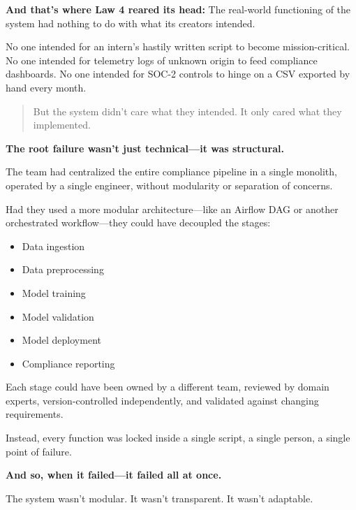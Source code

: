     \medskip
    
    \textbf{And that’s where Law 4 reared its head:}  
    The real-world functioning of the system had nothing to do with what its creators intended.
    
    No one intended for an intern’s hastily written script to become mission-critical.  
    No one intended for telemetry logs of unknown origin to feed compliance dashboards.  
    No one intended for SOC-2 controls to hinge on a CSV exported by hand every month.
    
    \begin{quote}
    But the system didn’t care what they intended.
    It only cared what they implemented.
    \end{quote}
    
    \medskip
    
    \textbf{The root failure wasn’t just technical—it was structural.}
    
    The team had centralized the entire compliance pipeline in a single monolith, operated by a single engineer, without modularity or separation of concerns.
    
    Had they used a more modular architecture—like an Airflow DAG or another orchestrated workflow—they could have decoupled the stages:
    
    \begin{itemize}
        \item Data ingestion
        \item Data preprocessing
        \item Model training
        \item Model validation
        \item Model deployment
        \item Compliance reporting
    \end{itemize}
    
    Each stage could have been owned by a different team, reviewed by domain experts, version-controlled independently, and validated against changing requirements.
    
    Instead, every function was locked inside a single script, a single person, a single point of failure.
    
    \medskip
    
    \textbf{And so, when it failed—it failed all at once.}
    
    The system wasn’t modular.  
    It wasn’t transparent.  
    It wasn’t adaptable.
    
